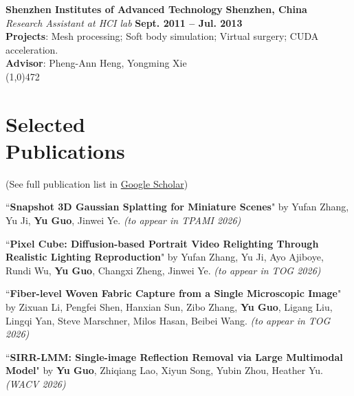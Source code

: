 \documentclass[margin,line]{resume}
\begin{document}
\begin{resume}
    \vspace{0.0mm}
    
    \textbf{Shenzhen Institutes of Advanced Technology}   \hfill \textbf{Shenzhen, China} \\
    \textsl{Research Assistant at HCI lab} \hfill \textbf{Sept. 2011 -- Jul. 2013} \\
    \textbf{Projects}: Mesh processing; Soft body simulation; Virtual surgery; CUDA acceleration. \\
    \textbf{Advisor}: Pheng-Ann Heng, Yongming Xie \\

	\vspace{-5.0mm}
	\line(1,0){472}
	\vspace{-5.0mm}
	
	\section{\mysidestyle Selected \\Publications}
	
	(See full publication list in \href{https://scholar.google.com/citations?user=V2BnBGIAAAAJ&hl=en}{Google Scholar})

	``\textbf{Snapshot 3D Gaussian Splatting for Miniature Scenes}" 
	by Yufan Zhang, Yu Ji, \textbf{Yu Guo}, Jinwei Ye.
	\textsl{(to appear in TPAMI 2026)}\\

	\vspace{-5mm}	

	``\textbf{Pixel Cube: Diffusion-based Portrait Video Relighting Through Realistic Lighting Reproduction}" 
	by Yufan Zhang, Yu Ji, Ayo Ajiboye, Rundi Wu, \textbf{Yu Guo}, Changxi Zheng, Jinwei Ye.
	\textsl{(to appear in TOG 2026)}\\

	\vspace{-5mm}	

	``\textbf{Fiber-level Woven Fabric Capture from a Single Microscopic Image}" 
	by Zixuan Li, Pengfei Shen, Hanxian Sun, Zibo Zhang, \textbf{Yu Guo}, Ligang Liu, Lingqi Yan, Steve Marschner, Milos Hasan, Beibei Wang.
	\textsl{(to appear in TOG 2026)}\\

	\vspace{-5mm}	

	``\textbf{SIRR-LMM: Single-image Reflection Removal via Large Multimodal Model}" 
	by \textbf{Yu Guo}, Zhiqiang Lao, Xiyun Song, Yubin Zhou, Heather Yu.
	\textsl{(WACV 2026)}\\


\end{resume}
\end{document}
